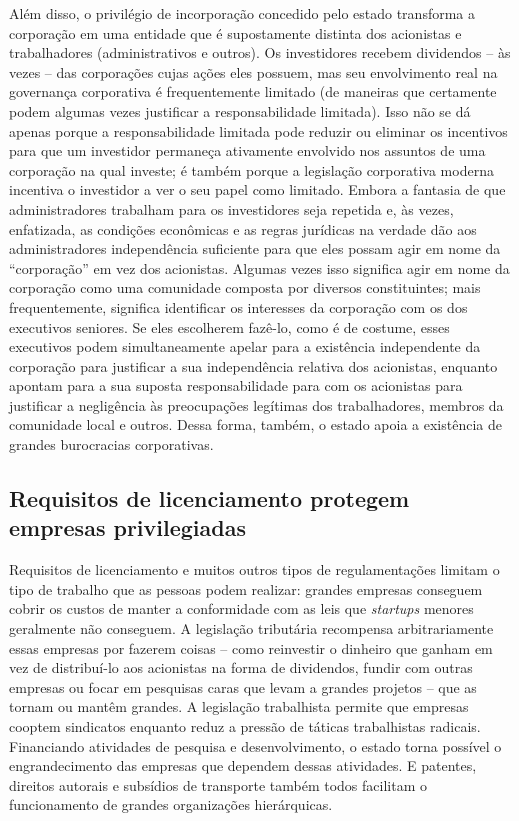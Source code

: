 Além disso, o privilégio de incorporação concedido pelo estado transforma a corporação em uma entidade que é supostamente distinta dos acionistas e trabalhadores (administrativos e outros). Os investidores recebem dividendos -- às vezes -- das corporações cujas ações eles possuem, mas seu envolvimento real na governança corporativa é frequentemente limitado (de maneiras que certamente podem algumas vezes justificar a responsabilidade limitada). Isso não se dá apenas porque a responsabilidade limitada pode reduzir ou eliminar os incentivos para que um investidor permaneça ativamente envolvido nos assuntos de uma corporação na qual investe; é também porque a legislação corporativa moderna incentiva o investidor a ver o seu papel como limitado. Embora a fantasia de que administradores trabalham para os investidores seja repetida e, às vezes, enfatizada, as condições econômicas e as regras jurídicas na verdade dão aos administradores independência suficiente para que eles possam agir em nome da ``corporação'' em vez dos acionistas. Algumas vezes isso significa agir em nome da corporação como uma comunidade composta por diversos constituintes; mais frequentemente, significa identificar os interesses da corporação com os dos executivos seniores. Se eles escolherem fazê-lo, como é de costume, esses executivos podem simultaneamente apelar para a existência independente da corporação para justificar a sua independência relativa dos acionistas, enquanto apontam para a sua suposta responsabilidade para com os acionistas para justificar a negligência às preocupações legítimas dos trabalhadores, membros da comunidade local e outros. Dessa forma, também, o estado apoia a existência de grandes burocracias corporativas.

\subsection*{Requisitos de licenciamento protegem empresas privilegiadas}

Requisitos de licenciamento e muitos outros tipos de regulamentações limitam o tipo de trabalho que as pessoas podem realizar: grandes empresas conseguem cobrir os custos de manter a conformidade com as leis que \emph{startups} menores geralmente não conseguem. A legislação tributária recompensa arbitrariamente essas empresas por fazerem coisas -- como reinvestir o dinheiro que ganham em vez de distribuí-lo aos acionistas na forma de dividendos, fundir com outras empresas ou focar em pesquisas caras que levam a grandes projetos -- que as tornam ou mantêm grandes. A legislação trabalhista permite que empresas cooptem sindicatos enquanto reduz a pressão de táticas trabalhistas radicais. Financiando atividades de pesquisa e desenvolvimento, o estado torna possível o engrandecimento das empresas que dependem dessas atividades. E patentes, direitos autorais e subsídios de transporte também todos facilitam o funcionamento de grandes organizações hierárquicas.

